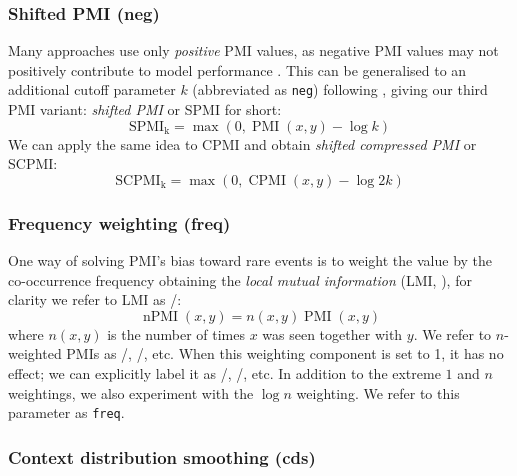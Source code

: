 \subsubsection{Shifted PMI (neg)}
\label{sec:shifted-pmi}

Many approaches use only \emph{positive} PMI values, as  negative PMI values may not positively contribute to model performance \cite{Turney:2010:FMV:1861751.1861756}. This can be generalised to an additional cutoff parameter $k$ (abbreviated as \texttt{neg}) following , giving our third PMI variant: \emph{shifted PMI} or SPMI for short:
%
\begin{equation}
  \label{eq:ppmi}
  \operatorname{SPMI_k} = \max (0, \operatorname{PMI}(x, y) - \log k)
\end{equation}
%
We can apply the same idea to CPMI and obtain \emph{shifted compressed PMI} or SCPMI:
%
\begin{equation}
  \label{eq:pcpmi}
  \operatorname{SCPMI_k} = \max (0, \operatorname{CPMI}(x, y) - \log 2k)
\end{equation}

\subsubsection{Frequency weighting (freq)}
\label{sec:frequency-weighting}

One way of solving PMI's bias toward rare events is to weight the value by the co-occurrence frequency obtaining the \emph{local mutual information} (LMI, ), for clarity we refer to LMI as \NPMI/:
%
\begin{equation}
  \label{eq:lmi}
  \operatorname{nPMI}(x, y) = n(x, y)\operatorname{PMI}(x, y)
\end{equation}
%
where $n(x, y)$ is the number of times $x$ was seen together with $y$. We refer to $n$-weighted PMIs as \NPMI/, \NSPMI/, etc. When this weighting component is set to 1, it has no effect; we can explicitly label it as \PMI/, \SPMI/, etc. In addition to the extreme $1$ and $n$ weightings, we also experiment with the $\log n$ weighting. We refer to this parameter as \texttt{freq}.

\subsubsection{Context distribution smoothing (cds)}
\label{sec:cont-distr-smooth}

